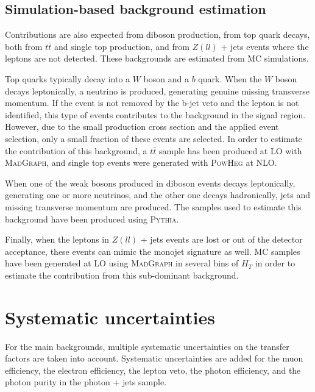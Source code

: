 \subsection{Simulation-based background estimation}

Contributions are also expected from diboson production, from top quark decays, both from $t\bar{t}$ and single top production, and from $Z(ll)$ + jets events where the leptons are not detected. These backgrounds are estimated from MC simulations. 

Top quarks typically decay into a $W$ boson and a $b$ quark. When the $W$ boson decays leptonically, a neutrino is produced, generating genuine missing transverse momentum. If the event is not removed by the b-jet veto and the lepton is not identified, this type of events contributes to the background in the signal region. However, due to the small production cross section and the applied event selection, only a small fraction of these events are selected. In order to estimate the contribution of this background, a $t\bar{t}$ sample has been produced at \ac{LO} with \textsc{MadGraph}, and single top events were generated with \textsc{PowHeg} at \ac{NLO}.

When one of the weak bosons produced in diboson events decays leptonically, generating one or more neutrinos, and the other one decays hadronically, jets and missing transverse momentum are produced. The samples used to estimate this background have been produced using \textsc{Pythia}.

Finally, when the leptons in $Z(ll)$ + jets events are lost or out of the detector acceptance, these events can mimic the monojet signature as well. MC samples have been generated at \ac{LO} using \textsc{MadGraph} in several bins of $H_T$ in order to estimate the contribution from this sub-dominant background.

\section{Systematic uncertainties}
\label{sec:syst}

For the main backgrounds, multiple systematic uncertainties on the transfer factors are taken into account. Systematic uncertainties are added for the muon efficiency, the electron efficiency, the lepton veto, the photon efficiency, and the photon purity in the photon + jets sample. 

